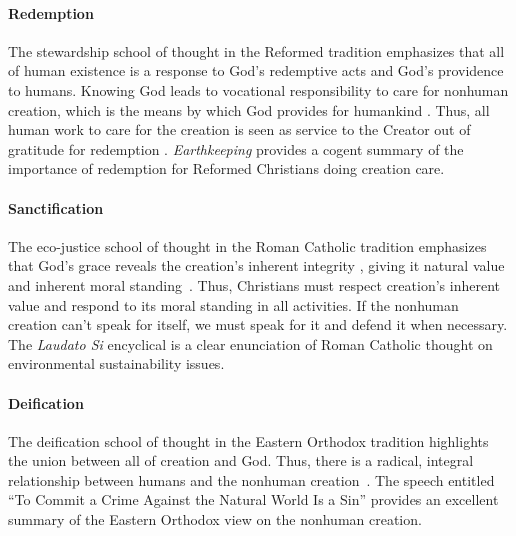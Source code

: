 \documentclass[12pt]{article}
\begin{document}
\paragraph{Redemption} 
\label{sec:redemption}

The stewardship school of thought in the Reformed tradition
emphasizes that all of human existence
is a response to God's redemptive acts
and God's providence to humans.
Knowing God leads to vocational responsibility 
to care for nonhuman creation,
which is the means by which God provides for humankind \autocite{Jenkins:2008} \autocite[19]{Jenkins:2008}. 
Thus, all human work to care for the creation 
is seen as service to the Creator
out of gratitude for redemption \autocite[77]{Jenkins:2008}.
\emph{Earthkeeping} \autocite{Wilkenson:1980aa} provides a cogent summary
of the importance of redemption for Reformed Christians doing creation care.

\paragraph{Sanctification} 
\label{sec:sanctification}

The eco-justice school of thought in the Roman Catholic tradition
emphasizes that God's grace reveals the creation's 
inherent integrity \autocite[19]{Jenkins:2008}, 
giving it natural value and inherent moral standing~\autocite{Joldersma:2019}. 
Thus, Christians must respect creation's inherent value and 
respond to its moral standing in all activities.
If the nonhuman creation can't speak for itself, 
we must speak for it and defend it when necessary.
The \emph{Laudato Si} encyclical \autocite{Pope-Francis:2015aa} 
is a clear enunciation of Roman Catholic thought
on environmental sustainability issues.

\paragraph{Deification} 
\label{sec:deification}

The deification school of thought in the Eastern Orthodox tradition
highlights the union between all of creation and God.
Thus, there is a radical, integral relationship between humans and 
the nonhuman creation~\autocite[93]{Jenkins:2008}.
The speech entitled ``To Commit a Crime Against the Natural World Is a Sin'' 
\autocite[133-136]{Bartholomew-I-of-Constantinople:2011aa}
provides an excellent summary of the Eastern Orthodox view
on the nonhuman creation.
\end{document}
